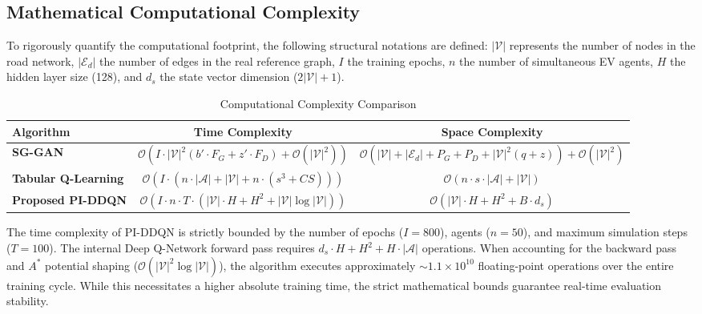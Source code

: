 \documentclass[journal, a4paper, twocolumn]{IEEEtran}
\begin{document}
\subsection{Mathematical Computational Complexity}
To rigorously quantify the computational footprint, the following structural notations are defined: $|\mathcal{V}|$ represents the number of nodes in the road network, $|\mathcal{E}_d|$ the number of edges in the real reference graph, $I$ the training epochs, $n$ the number of simultaneous EV agents, $H$ the hidden layer size (128), and $d_s$ the state vector dimension ($2|\mathcal{V}| + 1$).

\begin{table}[htbp]
\centering
\caption{Computational Complexity Comparison}
\label{tab:computational_complexity}
\footnotesize
\begin{tabular}{@{}l c c@{}}
\toprule
\textbf{Algorithm} & \textbf{Time Complexity} & \textbf{Space Complexity} \\ \midrule
\textbf{SG-GAN} & $\mathcal{O}\left(I \cdot |\mathcal{V}|^2 (b' \cdot F_G + z' \cdot F_D) + \mathcal{O}(|\mathcal{V}|^2)\right)$ & $\mathcal{O}\left(|\mathcal{V}| + |\mathcal{E}_d| + P_G + P_D + |\mathcal{V}|^2(q+z) \right) + \mathcal{O}(|\mathcal{V}|^2)$ \\ 
\textbf{Tabular Q-Learning} & $\mathcal{O}\left(I \cdot (n \cdot |\mathcal{A}| + |\mathcal{V}| + n \cdot (s^3 + CS))\right)$ & $\mathcal{O}\left(n \cdot s \cdot |\mathcal{A}| + |\mathcal{V}|\right)$ \\ 
\textbf{Proposed PI-DDQN} & $\mathcal{O}\left(I \cdot n \cdot T \cdot (|\mathcal{V}| \cdot H + H^2 + |\mathcal{V}| \log |\mathcal{V}|)\right)$ & $\mathcal{O}\left(|\mathcal{V}| \cdot H + H^2 + B \cdot d_s\right)$ \\ \bottomrule
\end{tabular}
\end{table}

The time complexity of PI-DDQN is strictly bounded by the number of epochs ($I = 800$), agents ($n = 50$), and maximum simulation steps ($T = 100$). The internal Deep Q-Network forward pass requires $d_s \cdot H + H^2 + H \cdot |\mathcal{A}|$ operations. When accounting for the backward pass and $A^*$ potential shaping ($\mathcal{O}(|\mathcal{V}|^2 \log |\mathcal{V}|)$), the algorithm executes approximately $\sim 1.1 \times 10^{10}$ floating-point operations over the entire training cycle. While this necessitates a higher absolute training time, the strict mathematical bounds guarantee real-time evaluation stability.
\end{document}
